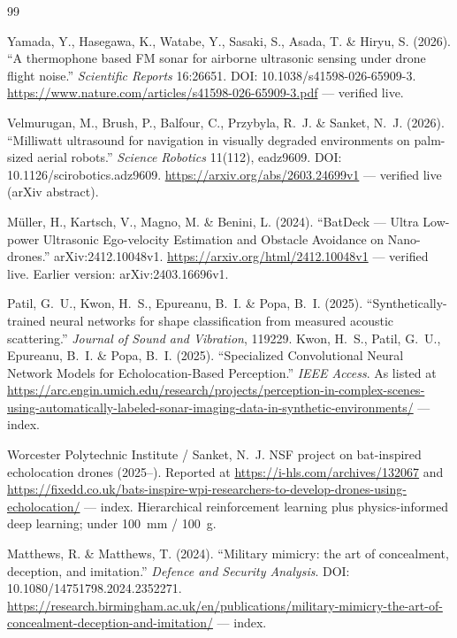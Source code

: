 \documentclass[11pt]{article}
\begin{document}
\begin{thebibliography}{99}

 Yamada, Y., Hasegawa, K., Watabe, Y., Sasaki, S.,
Asada, T. \& Hiryu, S. (2026). ``A thermophone based FM sonar for
airborne ultrasonic sensing under drone flight noise.''
\emph{Scientific Reports} 16:26651. DOI: 10.1038/s41598-026-65909-3.
\url{https://www.nature.com/articles/s41598-026-65909-3.pdf} ---
verified live.

 Velmurugan, M., Brush, P., Balfour, C., Przybyla,
R.~J. \& Sanket, N.~J. (2026). ``Milliwatt ultrasound for navigation in
visually degraded environments on palm-sized aerial robots.''
\emph{Science Robotics} 11(112), eadz9609. DOI:
10.1126/scirobotics.adz9609.
\url{https://arxiv.org/abs/2603.24699v1} --- verified live (arXiv
abstract).

 M\"uller, H., Kartsch, V., Magno, M. \& Benini,
L. (2024). ``BatDeck --- Ultra Low-power Ultrasonic Ego-velocity
Estimation and Obstacle Avoidance on Nano-drones.''
arXiv:2412.10048v1.
\url{https://arxiv.org/html/2412.10048v1} --- verified live. Earlier
version: arXiv:2403.16696v1.

 Patil, G.~U., Kwon, H.~S., Epureanu, B.~I. \&
Popa, B.~I. (2025). ``Synthetically-trained neural networks for shape
classification from measured acoustic scattering.'' \emph{Journal of
Sound and Vibration}, 119229. Kwon, H.~S., Patil, G.~U., Epureanu,
B.~I. \& Popa, B.~I. (2025). ``Specialized Convolutional Neural Network
Models for Echolocation-Based Perception.'' \emph{IEEE Access}. As
listed at
\url{https://arc.engin.umich.edu/research/projects/perception-in-complex-scenes-using-automatically-labeled-sonar-imaging-data-in-synthetic-environments/}
--- index.

 Worcester Polytechnic Institute / Sanket, N.~J. NSF
project on bat-inspired echolocation drones (2025--). Reported at
\url{https://i-hls.com/archives/132067} and
\url{https://fixedd.co.uk/bats-inspire-wpi-researchers-to-develop-drones-using-echolocation/}
--- index. Hierarchical reinforcement learning plus physics-informed
deep learning; under 100~mm / 100~g.

 Matthews, R. \& Matthews, T. (2024). ``Military
mimicry: the art of concealment, deception, and imitation.''
\emph{Defence and Security Analysis}. DOI:
10.1080/14751798.2024.2352271.
\url{https://research.birmingham.ac.uk/en/publications/military-mimicry-the-art-of-concealment-deception-and-imitation/}
--- index.


\end{thebibliography}
\end{document}
